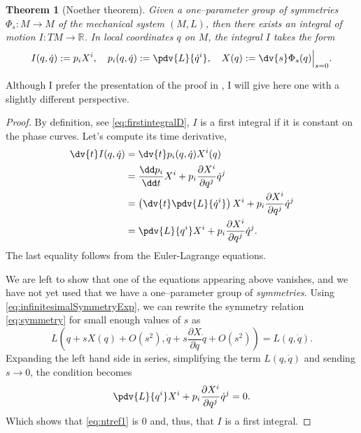 \documentclass[english,fontsize=11pt,paper=b5]{scrbook}
\numberwithin{equation}{chapter}
\newtheorem{theorem}{Theorem}[chapter]
\theoremstyle{definition}
\begin{document}
    \begin{theorem}[Noether theorem]\label{thm:noether}
      Given a one--parameter group of symmetries $\Phi_s: M \to M$ of the mechanical system $(M,L)$, then there exists an integral of motion $I: TM \to \mathbb{R}$.
      In local coordinates $q$ on $M$, the integral $I$ takes the form
      \begin{equation}
        I(q,\dot q) := p_i X^i,
        \quad p_i(q, \dot q) := \pdv{L}{\dot q^i},
        \quad X(q) := \dv{s} \Phi_s(q) \Big|_{s=0}.
      \end{equation}
    \end{theorem}

    Although I prefer the presentation of the proof in \cite[Chapter 20.B]{book:arnold}, I will give here one with a slightly different perspective.
    \begin{proof}
      By definition, see \eqref{eq:firstintegralD}, $I$ is a first integral if it is constant on the phase curves.
      Let's compute its time derivative,
      \begin{align}
        \dv{t} I(q, \dot q)
     & = \dv{t} p_i(q, \dot q) X^i(q)                                                                                 \\
     & = \frac{\dd p_i}{\dd t} X^i + p_i \frac{\partial X^i}{\partial q^j} \dot q^j                                              \\
     & = \left(\dv{t}\pdv{L}{\dot q^i}\right) X^i + p_i \frac{\partial X^i}{\partial q^j} \dot q^j \\
     & = \pdv{L}{q^i} X^i + p_i \frac{\partial X^i}{\partial q^j} \dot q^j. \label{eq:ntref1}
      \end{align}
      The last equality follows from the Euler-Lagrange equations.

      We are left to show that one of the equations appearing above vanishes, and we have not yet used that we have a one--parameter group of \emph{symmetries}.
      Using \eqref{eq:infinitesimalSymmetryExp}, we can rewrite the symmetry relation \eqref{eq:symmetry} for small enough values of $s$ as
      \begin{equation}\label{eq:invariance}
        L\left( q + s X(q) + O(s^2), \dot q + s \frac{\partial X}{\partial q} \dot q + O(s^2) \right) = L(q, \dot q).
      \end{equation}
      Expanding the left hand side in series, simplifying the term $L(q, \dot q)$ and sending $s\to 0$, the condition becomes
      \begin{equation}\label{eq:ntref2}
        \pdv{L}{q^i} X^i + p_i \frac{\partial X^i}{\partial q^j} \dot q^j = 0.
      \end{equation}
      Which shows that \eqref{eq:ntref1} is $0$ and, thus, that $I$ is a first integral.
    \end{proof}
\end{document}
